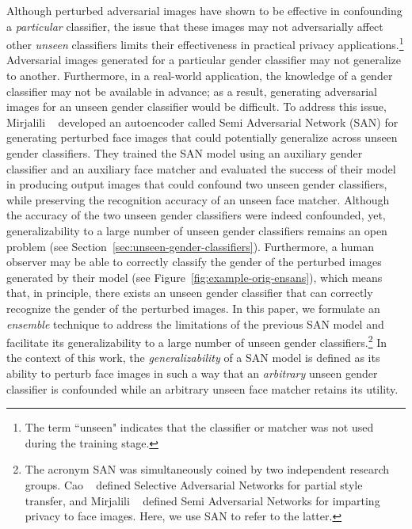 \documentclass[10pt,twocolumn,letterpaper]{article}
\begin{document}
Although perturbed adversarial images have shown to be effective in confounding a {\em particular} classifier, the issue that these images may not adversarially affect other {\em unseen} classifiers limits their effectiveness in practical privacy applications.\footnote{The term ``unseen" indicates that the classifier or matcher was not used during the training stage.}  Adversarial images generated for a particular gender classifier may not generalize to another. Furthermore, in a real-world application, the knowledge of a gender classifier may not be available in advance; as a result, generating adversarial images for an unseen gender classifier would be difficult. 
To address this issue, Mirjalili \etal~\cite{mirjalili_semi_2018} developed an autoencoder called Semi Adversarial Network (SAN) for generating perturbed face images that could potentially generalize across unseen gender classifiers. They trained the SAN model using an auxiliary gender classifier and an auxiliary face matcher and evaluated the success of their model in producing output images that could confound two unseen gender classifiers, while preserving the recognition accuracy of an unseen face matcher. Although the accuracy of the two unseen gender classifiers were indeed confounded, yet, generalizability to a large number of unseen gender classifiers remains an open problem (see Section~\ref{sec:unseen-gender-classifiers}). Furthermore, a human observer may be able to correctly classify the gender of the perturbed images generated by their model (see Figure~\ref{fig:example-orig-ensans}), which means that, in principle, there exists an unseen gender classifier that can correctly recognize the gender of the perturbed images. In this paper, we formulate an {\em ensemble} technique to address the limitations of the previous SAN model and facilitate its generalizability to a large number of unseen gender classifiers.\footnote{The acronym SAN was simultaneously coined by two independent research groups. Cao \etal~\cite{cao_partial_2017} defined Selective Adversarial Networks for partial style transfer, and Mirjalili \etal~\cite{mirjalili_semi_2018} defined Semi Adversarial Networks for imparting privacy to face images. Here, we use SAN to refer to the latter.} In the context of this work, the \textit{generalizability} of a SAN model is defined as its ability to perturb face images in such a way that an {\em arbitrary} unseen gender classifier is confounded while an arbitrary unseen face matcher retains its utility.

\end{document}
